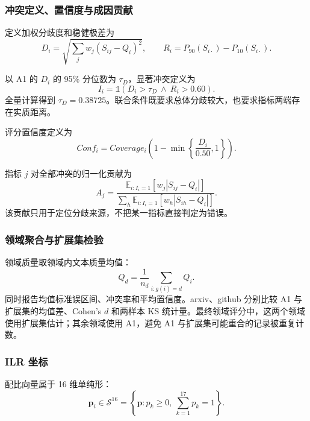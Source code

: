 \documentclass[bwprint]{gmcmthesis}
\providecommand{\I}{\mathds{1}}
\providecommand{\E}{\mathbb{E}}
\begin{document}
        
        \subsubsection{冲突定义、置信度与成因贡献}   %
        定义加权分歧度和稳健极差为
        \begin{equation}
        D_i=\sqrt{\sum_jw_j(S_{ij}-Q_i)^2},\qquad
        R_i=P_{90}(S_{i\cdot})-P_{10}(S_{i\cdot}).
        \label{eq:disagreement}
        \end{equation}
        
        以 A1 的 $D_i$ 的 95\% 分位数为 $\tau_D$，显著冲突定义为
        \begin{equation}
        I_i=\I(D_i>\tau_D\ \land\ R_i>0.60).
        \label{eq:conflict}
        \end{equation}
        全量计算得到 $\tau_D=0.38725$。联合条件既要求总体分歧较大，也要求指标两端存在实质距离。
        
        评分置信度定义为
        \begin{equation}
        Conf_i=Coverage_i\left(1-\min\left\{\frac{D_i}{0.50},1\right\}\right).
        \label{eq:confidence}
        \end{equation}
        
        指标 $j$ 对全部冲突的归一化贡献为
        \begin{equation}
        A_j=\frac{\E_{i:I_i=1}[w_j|S_{ij}-Q_i|]}
        {\sum_h\E_{i:I_i=1}[w_h|S_{ih}-Q_i|]}.
        \label{eq:attribution}
        \end{equation}
        该贡献只用于定位分歧来源，不把某一指标直接判定为错误。

        
        \subsubsection{领域聚合与扩展集检验}  %
        领域质量取领域内文本质量均值：
        \begin{equation}
        Q_d=\frac1{n_d}\sum_{i:g(i)=d}Q_i.
        \label{eq:domainq}
        \end{equation}
        同时报告均值标准误区间、冲突率和平均置信度。arxiv、github 分别比较 A1 与扩展集的均值差、Cohen's $d$ 和两样本 KS 统计量。最终领域评分中，这两个领域使用扩展集估计；其余领域使用 A1，避免 A1 与扩展集可能重合的记录被重复计数。
        
        
        \subsubsection{ILR 坐标}  %
        配比向量属于 16 维单纯形：
        \begin{equation}
        \bm p_i\in\mathcal S^{16}=\left\{\bm p:p_k\ge0,\ \sum_{k=1}^{17}p_k=1\right\}.
        \label{eq:simplex}
        \end{equation}
        
\end{document}
